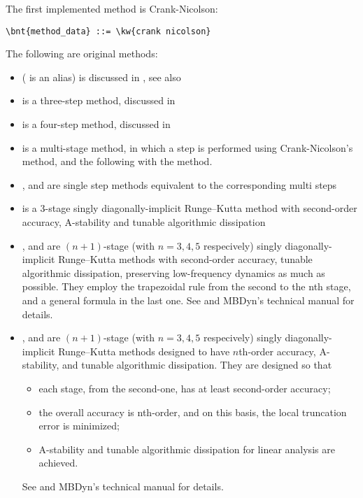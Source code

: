 The first implemented method is Crank-Nicolson:
\begin{Verbatim}[commandchars=\\\{\}]
    \bnt{method_data} ::= \kw{crank nicolson}
\end{Verbatim}

The following are original methods:
\begin{itemize}
\item {} ( is an alias) is discussed in \cite{MASARATI-LANZ-MANTEGAZZA-2001},
see also
\begin{quote}
\end{quote}
\item {} is a three-step method, discussed in \cite{ZHANG-2021-COMPMECH-MS34}
\item {} is a four-step method, discussed in \cite{ZHANG-2021-COMPMECH-MS34}
\item {} is a multi-stage method, in which a step is performed using Crank-Nicolson's method, and the following with the  method.
\item {},  and  are single step methods equivalent to the corresponding multi steps
\item {} is a 3-stage singly diagonally-implicit Runge--Kutta method with
second-order accuracy, A-stability and tunable algorithmic dissipation
\item {},  and  are $(n + 1)$-stage (with $n=3,4,5$ respecively) 
singly diagonally-implicit Runge--Kutta methods with second-order accuracy, 
tunable algorithmic dissipation, preserving low-frequency dynamics as much as
possible. They employ the trapezoidal rule from the second to the nth stage, and a general
formula in the last one. See \cite{zhang_optimization_2020, zhang_performance_2022} and MBDyn's technical manual for details.
\item {},  and  are  $(n + 1)$-stage  (with $n=3,4,5$ respecively)
singly diagonally-implicit Runge--Kutta methods designed to have $n$th-order accuracy, A-stability, and tunable algorithmic
dissipation. They are designed so that
\begin{itemize}
\item each stage, from the second-one, has at least second-order accuracy;
\item the overall accuracy is nth-order, and on this basis, the local truncation error is 
minimized;
\item A-stability and tunable algorithmic dissipation for linear analysis are achieved.
\end{itemize}
See \cite{zhang_optimization_2020, zhang_performance_2022} and MBDyn's technical manual for details.
\end{itemize}
